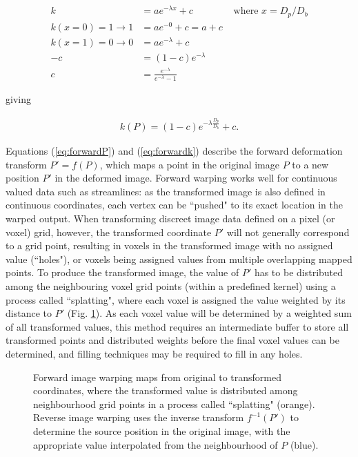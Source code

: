 \begin{align}
  k &= a e^{-\lambda x} + c &\text{ where } x = D_p / D_b \nonumber \\
  k(x=0)=1 \longrightarrow 1 &= a e^{-0} + c = a + c \nonumber \\
  k(x=1)=0 \longrightarrow 0 &= a e^{-\lambda} + c \nonumber \\
  -c &= (1-c) e^{-\lambda} \nonumber \\
  c &= \frac{e^{-\lambda}}{e^{-\lambda} - 1} \label{eq:c}
\end{align}

giving

\begin{align}\label{eq:forwardk}
  k(P) = (1-c)e^{-\lambda \frac{D_p}{D_b}} +c.
\end{align}

Equations (\ref{eq:forwardP}) and (\ref{eq:forwardk}) describe the forward deformation transform $P'=f(P)$, which maps a point in the original image $P$ to a new position $P'$ in the deformed image.
Forward warping works well for continuous valued data such as streamlines: as the transformed image is also defined in continuous coordinates, each vertex can be ``pushed" to its exact location in the warped output.
When transforming discreet image data defined on a pixel (or voxel) grid, however, the transformed coordinate $P'$ will not generally correspond to a grid point, resulting in voxels in the transformed image with no assigned value (``holes"), or voxels being assigned values from multiple overlapping mapped points.
To produce the transformed image, the value of $P'$ has to be distributed among the neighbouring voxel grid points (within a predefined kernel) using a process called ``splatting",\autocite{Niklaus2020} where each voxel is assigned the value weighted by its distance to $P'$ (Fig. \ref{fig:warp}).
As each voxel value will be determined by a weighted sum of all transformed values, this method requires an intermediate buffer to store all transformed points and distributed weights before the final voxel values can be determined, and filling techniques may be required to fill in any holes.

\begin{figure}[h!]
  \centering
  
  \caption{Forward image warping maps from original to transformed coordinates, where the transformed value is distributed among neighbourhood grid points in a process called ``splatting" (orange). Reverse image warping uses the inverse transform $f^{-1}(P')$ to determine the source position in the original image, with the appropriate value interpolated from the neighbourhood of $P$ (blue).}
  \label{fig:warp}
\end{figure}

